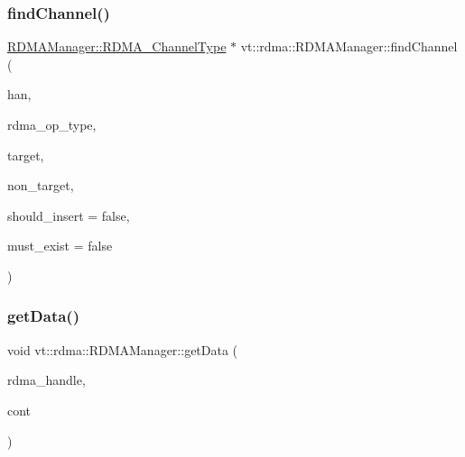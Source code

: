 \subsubsection{\texorpdfstring{find\+Channel()}{findChannel()}}
{\footnotesize\ttfamily \hyperlink{structvt_1_1rdma_1_1_r_d_m_a_manager_ad6a7e417dca07fe5743318e1153677a8}{R\+D\+M\+A\+Manager\+::\+R\+D\+M\+A\+\_\+\+Channel\+Type} $\ast$ vt\+::rdma\+::\+R\+D\+M\+A\+Manager\+::find\+Channel (\begin{DoxyParamCaption}\item[{\hyperlink{namespacevt_a10442579ec4e7ebef223818e64bcf908}{R\+D\+M\+A\+\_\+\+Handle\+Type} const \&}]{han,  }\item[{\hyperlink{namespacevt_1_1rdma_ac848e1d9da43db6294bd06f83e5d3946}{R\+D\+M\+A\+\_\+\+Type\+Type} const \&}]{rdma\+\_\+op\+\_\+type,  }\item[{\hyperlink{namespacevt_a866da9d0efc19c0a1ce79e9e492f47e2}{Node\+Type} const \&}]{target,  }\item[{\hyperlink{namespacevt_a866da9d0efc19c0a1ce79e9e492f47e2}{Node\+Type} const \&}]{non\+\_\+target,  }\item[{bool const \&}]{should\+\_\+insert = {\ttfamily false},  }\item[{bool const \&}]{must\+\_\+exist = {\ttfamily false} }\end{DoxyParamCaption})\hspace{0.3cm}{\ttfamily [private]}}

\mbox{\label{structvt_1_1rdma_1_1_r_d_m_a_manager_aebefa1395f990efb66284adc1495f6d4}} 
\subsubsection{\texorpdfstring{get\+Data()}{getData()}\hspace{0.1cm}{\footnotesize\ttfamily [1/2]}}
{\footnotesize\ttfamily void vt\+::rdma\+::\+R\+D\+M\+A\+Manager\+::get\+Data (\begin{DoxyParamCaption}\item[{\hyperlink{namespacevt_a10442579ec4e7ebef223818e64bcf908}{R\+D\+M\+A\+\_\+\+Handle\+Type} const \&}]{rdma\+\_\+handle,  }\item[{\hyperlink{namespacevt_1_1rdma_a36020f2b7ae371b6ddc8ec9caffb72d2}{R\+D\+M\+A\+\_\+\+Recv\+Type}}]{cont }\end{DoxyParamCaption})\hspace{0.3cm}{\ttfamily [inline]}}



